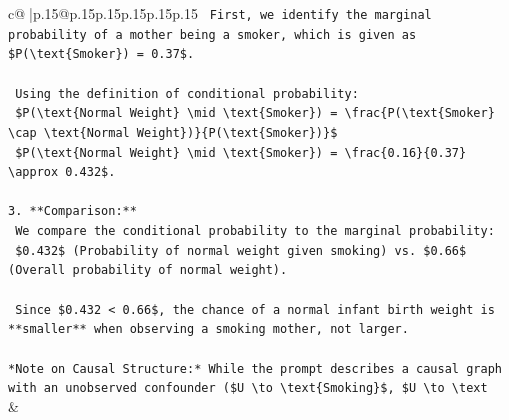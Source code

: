 \documentclass{article}
\begin{document}
{\begin{supertabular}{c@{$\;$}|p{.15\linewidth}@{}p{.15\linewidth}p{.15\linewidth}p{.15\linewidth}p{.15\linewidth}p{.15\linewidth}}
{{{\texttt{    First, we identify the marginal probability of a mother being a smoker, which is given as \$P(\textbackslash{}text\{Smoker\}) = 0.37\$.} \\
\\ 
\texttt{    Using the definition of conditional probability:} \\
\texttt{    \$P(\textbackslash{}text\{Normal Weight\} \textbackslash{}mid \textbackslash{}text\{Smoker\}) = \textbackslash{}frac\{P(\textbackslash{}text\{Smoker\} \textbackslash{}cap \textbackslash{}text\{Normal Weight\})\}\{P(\textbackslash{}text\{Smoker\})\}\$} \\
\texttt{    \$P(\textbackslash{}text\{Normal Weight\} \textbackslash{}mid \textbackslash{}text\{Smoker\}) = \textbackslash{}frac\{0.16\}\{0.37\} \textbackslash{}approx 0.432\$.} \\
\\ 
\texttt{3.  **Comparison:**} \\
\texttt{    We compare the conditional probability to the marginal probability:} \\
\texttt{    \$0.432\$ (Probability of normal weight given smoking) vs. \$0.66\$ (Overall probability of normal weight).} \\
\\ 
\texttt{    Since \$0.432 < 0.66\$, the chance of a normal infant birth weight is **smaller** when observing a smoking mother, not larger.} \\
\\ 
\texttt{*Note on Causal Structure:* While the prompt describes a causal graph with an unobserved confounder (\$U \textbackslash{}to \textbackslash{}text\{Smoking\}\$, \$U \textbackslash{}to \textbackslash{}text} \\
            }
        }
    }
    & \\ \\


\end{supertabular}}
\end{document}
